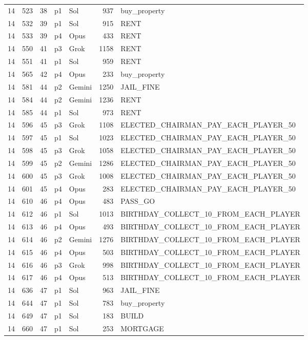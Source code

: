 \begin{longtable}{r r r l l r L{2.2in}}
14 & 523 & 38 & p1 & Sol & 937 & buy\_property \\
14 & 532 & 39 & p1 & Sol & 915 & RENT \\
14 & 533 & 39 & p4 & Opus & 433 & RENT \\
14 & 550 & 41 & p3 & Grok & 1158 & RENT \\
14 & 551 & 41 & p1 & Sol & 959 & RENT \\
14 & 565 & 42 & p4 & Opus & 233 & buy\_property \\
14 & 581 & 44 & p2 & Gemini & 1250 & JAIL\_FINE \\
14 & 584 & 44 & p2 & Gemini & 1236 & RENT \\
14 & 585 & 44 & p1 & Sol & 973 & RENT \\
14 & 596 & 45 & p3 & Grok & 1108 & ELECTED\_CHAIRMAN\_PAY\_EACH\_PLAYER\_50 \\
14 & 597 & 45 & p1 & Sol & 1023 & ELECTED\_CHAIRMAN\_PAY\_EACH\_PLAYER\_50 \\
14 & 598 & 45 & p3 & Grok & 1058 & ELECTED\_CHAIRMAN\_PAY\_EACH\_PLAYER\_50 \\
14 & 599 & 45 & p2 & Gemini & 1286 & ELECTED\_CHAIRMAN\_PAY\_EACH\_PLAYER\_50 \\
14 & 600 & 45 & p3 & Grok & 1008 & ELECTED\_CHAIRMAN\_PAY\_EACH\_PLAYER\_50 \\
14 & 601 & 45 & p4 & Opus & 283 & ELECTED\_CHAIRMAN\_PAY\_EACH\_PLAYER\_50 \\
14 & 610 & 46 & p4 & Opus & 483 & PASS\_GO \\
14 & 612 & 46 & p1 & Sol & 1013 & BIRTHDAY\_COLLECT\_10\_FROM\_EACH\_PLAYER \\
14 & 613 & 46 & p4 & Opus & 493 & BIRTHDAY\_COLLECT\_10\_FROM\_EACH\_PLAYER \\
14 & 614 & 46 & p2 & Gemini & 1276 & BIRTHDAY\_COLLECT\_10\_FROM\_EACH\_PLAYER \\
14 & 615 & 46 & p4 & Opus & 503 & BIRTHDAY\_COLLECT\_10\_FROM\_EACH\_PLAYER \\
14 & 616 & 46 & p3 & Grok & 998 & BIRTHDAY\_COLLECT\_10\_FROM\_EACH\_PLAYER \\
14 & 617 & 46 & p4 & Opus & 513 & BIRTHDAY\_COLLECT\_10\_FROM\_EACH\_PLAYER \\
14 & 636 & 47 & p1 & Sol & 963 & JAIL\_FINE \\
14 & 644 & 47 & p1 & Sol & 783 & buy\_property \\
14 & 649 & 47 & p1 & Sol & 183 & BUILD \\
14 & 660 & 47 & p1 & Sol & 253 & MORTGAGE \\

\end{longtable}
